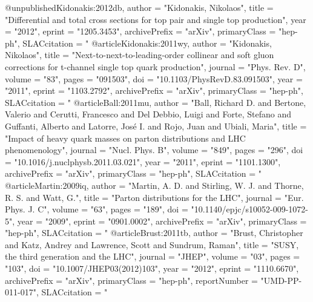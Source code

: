 @unpublished{Kidonakis:2012db,
      author         = "Kidonakis, Nikolaos",
      title          = "{Differential and total cross sections for top pair and
                        single top production}",
      year           = "2012",
      eprint         = "1205.3453",
      archivePrefix  = "arXiv",
      primaryClass   = "hep-ph",
      SLACcitation   = "%
}
@article{Kidonakis:2011wy,
      author         = "Kidonakis, Nikolaos",
      title          = "{Next-to-next-to-leading-order collinear and soft gluon
                        corrections for t-channel single top quark production}",
      journal        = "Phys. Rev. D",
      volume         = "83",
      pages          = "091503",
      doi            = "10.1103/PhysRevD.83.091503",
      year           = "2011",
      eprint         = "1103.2792",
      archivePrefix  = "arXiv",
      primaryClass   = "hep-ph",
      SLACcitation   = "%
}
@article{Ball:2011mu,
      author         = "Ball, Richard D. and Bertone, Valerio and Cerutti,
                        Francesco and Del Debbio, Luigi and Forte, Stefano and
                        Guffanti, Alberto and Latorre, Jos{\'e} I. and Rojo, Juan and Ubiali, Maria",
      title          = "{Impact of heavy quark masses on parton distributions and
                        {LHC} phenomenology}",
      journal        = "Nucl. Phys. B",
      volume         = "849",
      pages          = "296",
      doi            = "10.1016/j.nuclphysb.2011.03.021",
      year           = "2011",
      eprint         = "1101.1300",
      archivePrefix  = "arXiv",
      primaryClass   = "hep-ph",
      SLACcitation   = "%
}
@article{Martin:2009iq,
      author         = "Martin, A. D. and Stirling, W. J. and Thorne, R. S. and
                        Watt, G.",
      title          = "{Parton distributions for the {LHC}}",
      journal        = "Eur. Phys. J. C",
      volume         = "63",
      pages          = "189",
      doi            = "10.1140/epjc/s10052-009-1072-5",
      year           = "2009",
      eprint         = "0901.0002",
      archivePrefix  = "arXiv",
      primaryClass   = "hep-ph",
      SLACcitation   = "%
}
@article{Brust:2011tb,
      author         = "Brust, Christopher and Katz, Andrey and Lawrence, Scott
                        and Sundrum, Raman",
      title          = "{SUSY, the third generation and the LHC}",
      journal        = "JHEP",
      volume         = "03",
      pages          = "103",
      doi            = "10.1007/JHEP03(2012)103",
      year           = "2012",
      eprint         = "1110.6670",
      archivePrefix  = "arXiv",
      primaryClass   = "hep-ph",
      reportNumber   = "UMD-PP-011-017",
      SLACcitation   = "%
}
